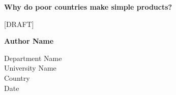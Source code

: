 \begin{titlepage}
    \begin{center}
        \vspace*{1cm}

        \Huge
        \textbf{Why do poor countries make simple products?}

        \vspace{0.5cm}
        \LARGE
        [DRAFT]

        \vspace{1.5cm}

        \textbf{Author Name}

        \vfill


        \vspace{0.8cm}


        \Large
        Department Name\\
        University Name\\
        Country\\
        Date

    \end{center}
\end{titlepage}

